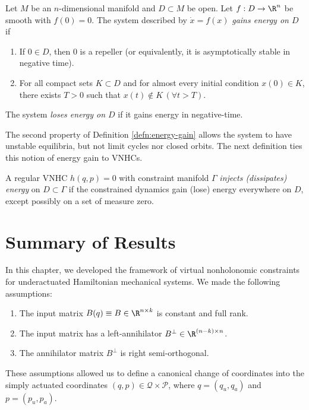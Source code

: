 \begin{defn}\label{defn:energy-gain}
    Let \(M\) be an \(n\)-dimensional manifold and \(D \subset M\) be open.
    Let \(f : D \rightarrow \R^n\) be smooth with \(f(0) = 0\).
    The system described by \(\dot{x} = f(x)\) 
    \textit{gains energy on \(D\)} if 
    \begin{enumerate}
        \item If \(0 \in D\), then \(0\) is a repeller 
         (or equivalently, it is asymptotically stable in negative time).
      \item For all compact sets \(K \subset D\) and for almost every initial
         condition \(x(0) \in K\), there exists \(T > 0\) such
         that \(x(t) \notin K \, (\forall t > T)\).
    \end{enumerate}
    The system \textit{loses energy on \(D\)} if it gains energy in
    negative-time.
\end{defn}

The second property of Definition \ref{defn:energy-gain} allows the system
to have unstable equilibria, but not limit cycles nor closed orbits.
The next definition ties this notion of energy gain to VNHCs.

\begin{defn}\label{defn:energy-injection}
    A regular VNHC \(h(q, p) = 0\) with constraint manifold \(\Gamma\)
    \textit{injects (dissipates) energy} on \(D \subset \Gamma\) if the
    constrained dynamics gain (lose) energy everywhere on \(D\), except possibly
    on a set of measure zero.
\end{defn}

\section{Summary of Results}
In this chapter, we developed the framework of virtual nonholonomic constraints
for underactuated Hamiltonian mechanical systems.
We made the following assumptions:
\begin{enumerate}
    \item The input matrix \(B(q) \equiv B \in \R^{n \times k}\) is constant and
        full rank.
    \item The input matrix has a left-annihilator 
        \(B^\perp \in \R^{(n-k)\times n}\). 
    \item The annihilator matrix \(B^\perp\) is right semi-orthogonal.
\end{enumerate}
These assumptions allowed us to define a canonical change of coordinates
into the simply actuated coordinates 
\((q,p) \in \mathcal{Q} \times \mathcal{P}\),
where \(q = (q_u,q_a)\) and \(p = (p_u,p_a)\).

